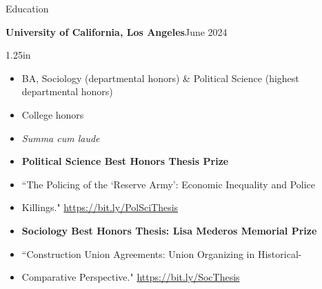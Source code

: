 \documentclass[
	12pt, %
]{resume} %
\newcommand{\righthandindent}{1.25in}
\begin{document}
\begin{rSection}{Education}

\textbf{University of California, Los Angeles}\hfill June 2024
\begin{adjustwidth}{0pt}{\righthandindent}
\vspace{-7pt}
\begin{itemize}
    \item[] BA, Sociology (departmental honors) \& Political Science (highest departmental honors)
    \item[] College honors
    \vspace{-7pt}
    \item[] \textit{Summa cum laude}
    \item[] \textbf{Political Science Best Honors Thesis Prize}
    \vspace{-7pt}
    \item[] ``The Policing of the `Reserve Army': Economic Inequality and Police 
    \vspace{-21pt}
    \item[] \hspace*{0.5in}Killings." \href{https://bit.ly/PolSciThesis}{https://bit.ly/PolSciThesis}
    \item[] \textbf{Sociology Best Honors Thesis: Lisa Mederos Memorial Prize}
    \vspace{-21pt}
    \item[] ``Construction Union Agreements: Union Organizing in Historical-
    \vspace{-7pt}
    \item[] \hspace*{0.5in}Comparative Perspective." \href{https://bit.ly/SocThesis}{https://bit.ly/SocThesis}

\end{itemize}
\end{adjustwidth}


\end{rSection}
\end{document}
